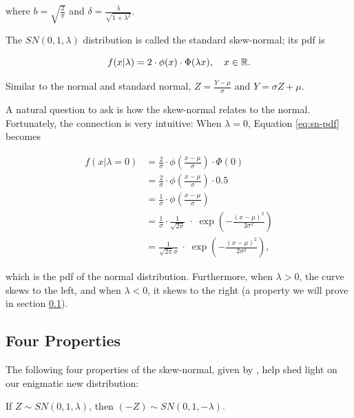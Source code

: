 \documentclass{article}
\begin{document}
where $b = \sqrt{\frac{2}{\pi}}$ and $\delta = \frac{\lambda}{\sqrt{1 +
\lambda^2}}$.

The $SN(0,1,\lambda)$ distribution is called the standard skew-normal; its pdf
is

\begin{equation} \label{eq:standard-sn-pdf}
  f(x|\lambda) = 2 \cdot \phi(x) \cdot \Phi (\lambda x), \quad x \in \mathbb{R}.
\end{equation}

Similar to the normal and standard normal, $Z = \frac{Y - \mu}{\sigma}$ and $Y
= \sigma Z + \mu$.

A natural question to ask is how the skew-normal relates to the normal.
Fortunately, the connection is very intuitive: When $\lambda = 0$, Equation
\eqref{eq:sn-pdf} becomes

\begin{align*}
  f(x|\lambda=0) &= \frac2\sigma \cdot \phi \left( \frac{x-\mu}{\sigma} \right) \cdot \Phi(0) \\
  &= \frac2\sigma \cdot \phi \left( \frac{x-\mu}{\sigma} \right) \cdot 0.5 \\
  &= \frac1\sigma \cdot \phi \left( \frac{x-\mu}{\sigma} \right) \\
  &= \frac1\sigma \cdot \frac{1}{\sqrt{2\pi}} \;\cdot\; \exp \left( -\frac{(x-\mu)^2}{2\sigma^2} \right) \\
  &= \frac{1}{\sqrt{2\pi}\sigma} \;\cdot\; \exp \left( -\frac{(x-\mu)^2}{2\sigma^2} \right),
\end{align*}

which is the pdf of the normal distribution. Furthermore, when $\lambda > 0$,
the curve skews to the left, and when $\lambda < 0$, it skews to the right (a
property we will prove in section \ref{subsec:four-properties}).

\subsection{Four Properties}
\label{subsec:four-properties}

The following four properties of the skew-normal, given by \citet{main}, help
shed light on our enigmatic new distribution:

\begin{property} \label{prop:1}
  If $Z \sim SN(0, 1, \lambda)$, then $(-Z) \sim SN(0, 1, -\lambda)$.
\end{property}
\end{document}
